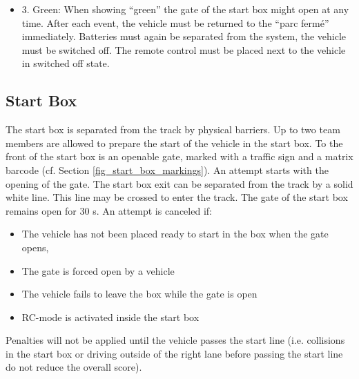 \documentclass[a4paper]{report}
\begin{document}
{{\begin{itemize}
\item 3. Green: When showing “green” the gate of the start box might open at any time. After each event, the vehicle must be returned to the “parc fermé” immediately. Batteries must again be separated from the system, the vehicle must be switched off. The remote control must be placed next to the vehicle in switched off state. 
\end{itemize}

\subsection{Start Box}
\label{start_box}

The start box is separated from the track by physical barriers. Up to two team members are allowed to prepare the start of the vehicle in the start box. To the front of the start box is an openable gate, marked with a traffic sign and a matrix barcode (cf. Section \ref{fig_start_box_markings}). An attempt starts with the opening of the gate. The start box exit can be separated from the track by a solid white line. This line may be crossed to enter the track. The gate of the start box remains open for 30 s. An attempt is canceled if: 

\begin{itemize}
	\item The vehicle has not been placed ready to start in the box when the gate opens,
	\item The gate is forced open by a vehicle

	\item The vehicle fails to leave the box while the gate is open 

	\item RC-mode is activated inside the start box
\end{itemize}

Penalties will not be applied until the vehicle passes the start line (i.e. collisions in the start box or driving outside of the right lane before passing the start line do not reduce the overall score). 

}}
\end{document}
